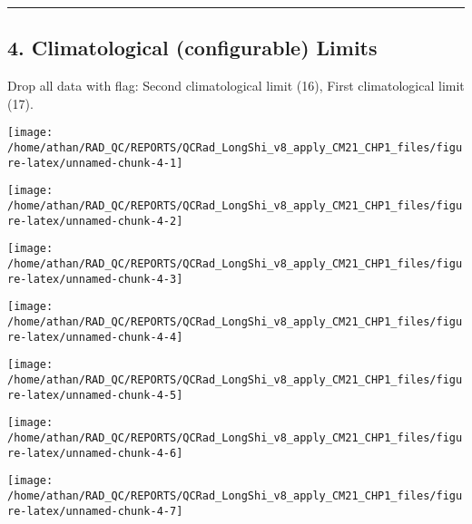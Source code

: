 \documentclass[
  10pt,
  a4paper,oneside]{article}
\begin{document}
\begin{center}\rule{0.5\linewidth}{0.5pt}\end{center}

\newpage

\hypertarget{climatological-configurable-limits}{%
\subsection{4. Climatological (configurable) Limits}\label{climatological-configurable-limits}}

Drop all data with flag: Second climatological limit (16), First climatological limit (17).

\begin{center}\texttt{[image: /home/athan/RAD\_QC/REPORTS/QCRad\_LongShi\_v8\_apply\_CM21\_CHP1\_files/figure-latex/unnamed-chunk-4-1]} \end{center}

\begin{center}\texttt{[image: /home/athan/RAD\_QC/REPORTS/QCRad\_LongShi\_v8\_apply\_CM21\_CHP1\_files/figure-latex/unnamed-chunk-4-2]} \end{center}

\begin{center}\texttt{[image: /home/athan/RAD\_QC/REPORTS/QCRad\_LongShi\_v8\_apply\_CM21\_CHP1\_files/figure-latex/unnamed-chunk-4-3]} \end{center}

\begin{center}\texttt{[image: /home/athan/RAD\_QC/REPORTS/QCRad\_LongShi\_v8\_apply\_CM21\_CHP1\_files/figure-latex/unnamed-chunk-4-4]} \end{center}

\begin{center}\texttt{[image: /home/athan/RAD\_QC/REPORTS/QCRad\_LongShi\_v8\_apply\_CM21\_CHP1\_files/figure-latex/unnamed-chunk-4-5]} \end{center}

\begin{center}\texttt{[image: /home/athan/RAD\_QC/REPORTS/QCRad\_LongShi\_v8\_apply\_CM21\_CHP1\_files/figure-latex/unnamed-chunk-4-6]} \end{center}

\begin{center}\texttt{[image: /home/athan/RAD\_QC/REPORTS/QCRad\_LongShi\_v8\_apply\_CM21\_CHP1\_files/figure-latex/unnamed-chunk-4-7]} \end{center}
\end{document}
